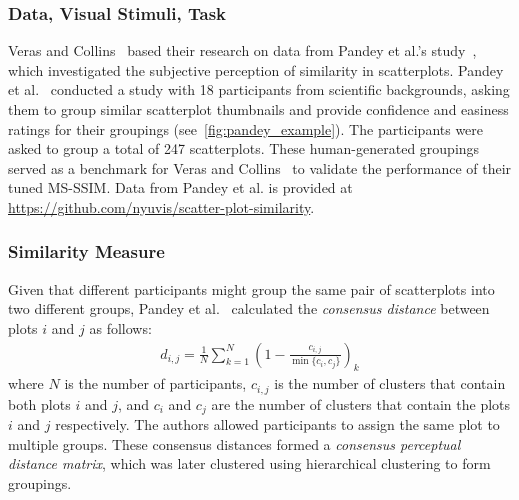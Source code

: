 \documentclass[sigconf]{acmart}
\begin{document}
\subsubsection{Data, Visual Stimuli, Task}

Veras and Collins~\cite{veras2019discriminability} based their research on data from Pandey et al.'s study~\cite{pandey2016towards}, which investigated the subjective perception of similarity in scatterplots. Pandey et al.~\cite{pandey2016towards} conducted a study with 18 participants from scientific backgrounds, asking them to group similar scatterplot thumbnails and provide confidence and easiness ratings for their groupings (see~\cref{fig:pandey_example}). The participants were asked to group a total of 247 scatterplots. These human-generated groupings served as a benchmark for Veras and Collins~\cite{veras2019discriminability} to validate the performance of their tuned MS-SSIM. Data from Pandey et al. is provided at \url{https://github.com/nyuvis/scatter-plot-similarity}. 

\subsubsection{Similarity Measure}

Given that different participants might group the same pair of scatterplots into two different groups, Pandey et al.~\cite{pandey2016towards} calculated the \textit{consensus distance} between plots $i$ and $j$ as follows: 
\begin{align}
    d_{i,j} = \frac{1}{N} \sum_{k=1}^N \left ( 1- \frac{c_{i,j}}{\min\{c_i, c_j\} } \right )_k
\end{align}
where $N$ is the number of participants, $c_{i, j}$ is the number of clusters that contain both plots $i$ and $j$, and $c_i$ and $c_j$ are the number of clusters that contain the plots $i$ and $j$ respectively. The authors allowed participants to assign the same plot to multiple groups. These consensus distances formed a \textit{consensus perceptual distance matrix}, which was later clustered using hierarchical clustering to form groupings.  
\end{document}
